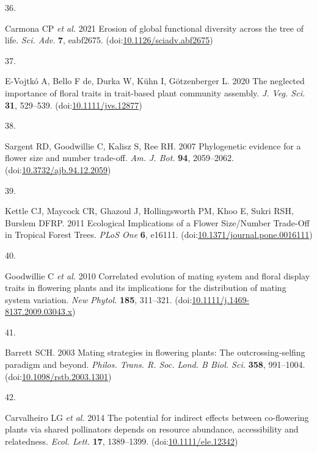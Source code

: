\documentclass[
  12pt,
  a4paper,
]{article}
\newlength{\cslhangindent}
\newlength{\csllabelwidth}
\newlength{\cslentryspacingunit} %
\newenvironment{CSLReferences}[2] %
 {%
  \setlength{\parindent}{0pt}
  \ifodd #1
  \let\oldpar\par
  \def\par{\hangindent=\cslhangindent\oldpar}
  \fi
  \setlength{\parskip}{#2\cslentryspacingunit}
 }%
 {}
\newcommand{\CSLLeftMargin}[1]{\parbox[t]{\csllabelwidth}{#1}}
\newcommand{\CSLRightInline}[1]{\parbox[t]{\linewidth - \csllabelwidth}{#1}\break}
\begin{document}
\begin{CSLReferences}{0}{0}
\leavevmode{}%
\CSLLeftMargin{36. }
\CSLRightInline{Carmona CP \emph{et al.} 2021 Erosion of global functional diversity across the tree of life. \emph{Sci. Adv.} \textbf{7}, eabf2675. (doi:\href{https://doi.org/10.1126/sciadv.abf2675}{10.1126/sciadv.abf2675})}

\leavevmode{}%
\CSLLeftMargin{37. }
\CSLRightInline{E-Vojtkó A, Bello F de, Durka W, Kühn I, Götzenberger L. 2020 The neglected importance of floral traits in trait-based plant community assembly. \emph{J. Veg. Sci.} \textbf{31}, 529--539. (doi:\href{https://doi.org/10.1111/jvs.12877}{10.1111/jvs.12877})}

\leavevmode{}%
\CSLLeftMargin{38. }
\CSLRightInline{Sargent RD, Goodwillie C, Kalisz S, Ree RH. 2007 Phylogenetic evidence for a flower size and number trade-off. \emph{Am. J. Bot.} \textbf{94}, 2059--2062. (doi:\href{https://doi.org/10.3732/ajb.94.12.2059}{10.3732/ajb.94.12.2059})}

\leavevmode{}%
\CSLLeftMargin{39. }
\CSLRightInline{Kettle CJ, Maycock CR, Ghazoul J, Hollingsworth PM, Khoo E, Sukri RSH, Burslem DFRP. 2011 Ecological {Implications} of a {Flower Size}/{Number Trade}-{Off} in {Tropical Forest Trees}. \emph{PLoS One} \textbf{6}, e16111. (doi:\href{https://doi.org/10.1371/journal.pone.0016111}{10.1371/journal.pone.0016111})}

\leavevmode{}%
\CSLLeftMargin{40. }
\CSLRightInline{Goodwillie C \emph{et al.} 2010 Correlated evolution of mating system and floral display traits in flowering plants and its implications for the distribution of mating system variation. \emph{New Phytol.} \textbf{185}, 311--321. (doi:\href{https://doi.org/10.1111/j.1469-8137.2009.03043.x}{10.1111/j.1469-8137.2009.03043.x})}

\leavevmode{}%
\CSLLeftMargin{41. }
\CSLRightInline{Barrett SCH. 2003 Mating strategies in flowering plants: The outcrossing-selfing paradigm and beyond. \emph{Philos. Trans. R. Soc. Lond. B Biol. Sci.} \textbf{358}, 991--1004. (doi:\href{https://doi.org/10.1098/rstb.2003.1301}{10.1098/rstb.2003.1301})}

\leavevmode{}%
\CSLLeftMargin{42. }
\CSLRightInline{Carvalheiro LG \emph{et al.} 2014 The potential for indirect effects between co-flowering plants via shared pollinators depends on resource abundance, accessibility and relatedness. \emph{Ecol. Lett.} \textbf{17}, 1389--1399. (doi:\href{https://doi.org/10.1111/ele.12342}{10.1111/ele.12342})}


\end{CSLReferences}
\end{document}
